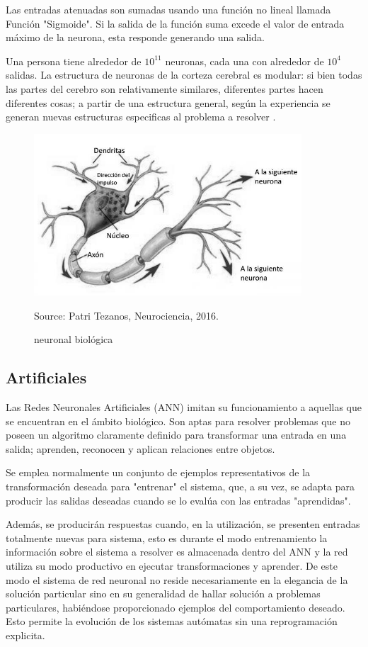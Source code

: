Las entradas atenuadas son sumadas usando una función no lineal llamada Función
"Sigmoide". Si la salida de la función suma excede el valor de entrada máximo de la
neurona, esta responde generando una salida.

Una persona tiene alrededor de $10^{11}$ neuronas, cada una con alrededor de $10^4$
salidas. La estructura de neuronas de la corteza cerebral es modular: si bien todas las
partes del cerebro son relativamente similares, diferentes partes hacen diferentes cosas; a
partir de una estructura general, según la experiencia se generan nuevas estructuras
especificas al problema a resolver \cite{16pusiol2014redes}. 


\begin{figure}[H]
		\centering
		\includegraphics[width=100mm]{./Imagenes/neurona_biologica.png}
		\caption{neuronal biológica}
		Source: Patri Tezanos, Neurociencia, 2016.
		\label{fig:neurona_biologica}
\end{figure} 


\subsection{Artificiales}
Las Redes Neuronales Artificiales (ANN) imitan su funcionamiento a aquellas
que se encuentran en el ámbito biológico. Son aptas para resolver problemas que no
poseen un algoritmo claramente definido para transformar una entrada en una salida;
aprenden, reconocen y aplican relaciones entre objetos.

Se emplea normalmente un conjunto de ejemplos representativos de la
transformación deseada para "entrenar" el sistema, que, a su vez, se adapta para producir
las salidas deseadas cuando se lo evalúa con las entradas "aprendidas".

Además, se producirán respuestas cuando, en la utilización, se presenten entradas
totalmente nuevas para sistema, esto es durante el modo entrenamiento la información
sobre el sistema a resolver es almacenada dentro del ANN y la red utiliza su modo
productivo en ejecutar transformaciones y aprender. De este modo el sistema de red
neuronal no reside necesariamente en la elegancia de la solución particular sino en su
generalidad de hallar solución a problemas particulares, habiéndose proporcionado
ejemplos del comportamiento deseado. Esto permite la evolución de los sistemas
autómatas sin una reprogramación explicita.

